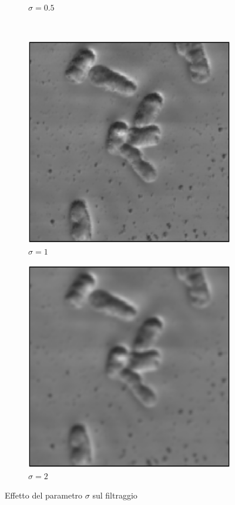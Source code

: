\documentclass[../main.tex]{subfiles}
\begin{document}
\begin{enumerate}
\begin{figure}[ht]
\begin{subfigure}{0.4\linewidth}
				\caption{$\sigma = 0.5$}
			\end{subfigure}\\[4pt]
			\begin{subfigure}{0.4\linewidth}
				\includegraphics[keepaspectratio, width=\linewidth]{images/gauss_1.png}
				\caption{$\sigma = 1$}
			\end{subfigure}
			\hspace{10pt}
			\begin{subfigure}{0.4\linewidth}
				\includegraphics[keepaspectratio, width=\linewidth]{images/gauss_2.png}
				\caption{$\sigma = 2$}
			\end{subfigure}
			\caption{Effetto del parametro $\sigma$ sul filtraggio}
		\end{figure}
		

\end{enumerate}
\end{document}
